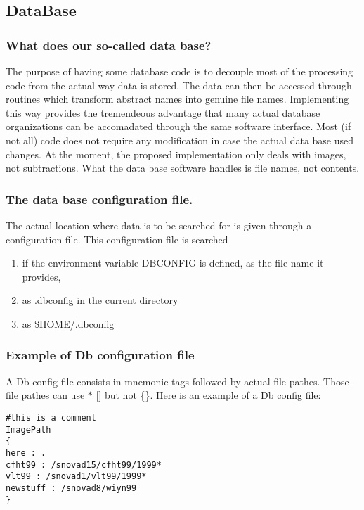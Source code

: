 \subsection{Data\-Base}\label{database_page}
 \subsubsection{What does our so-called data base?}\label{intro_database}
 The purpose of having some database code is to decouple most of the processing code from the actual way data is stored. The data can then be accessed through routines which transform abstract names into genuine file names. Implementing this way provides the tremendeous advantage that many actual database organizations can be accomadated through the same software interface. Most (if not all) code does not require any modification in case the actual data base used changes. At the moment, the proposed implementation only deals with images, not subtractions. What the data base software handles is file names, not contents.

\subsubsection{The data base configuration file.}\label{dbconfig}


The actual location where data is to be searched for is given through a configuration file. This configuration file is searched\begin{enumerate}
\item 
if the environment variable DBCONFIG is defined, as the file name it provides,\item 
as .dbconfig in the current directory\item 
as \$HOME/.dbconfig\end{enumerate}
\subsubsection{Example of Db configuration file}\label{dbconfig_example}
 A Db config file consists in mnemonic tags followed by actual file pathes. Those file pathes can use $\ast$ [] but not \{\}. Here is an example of a Db config file: \footnotesize\begin{verbatim}#this is a comment
ImagePath
{
here : .
cfht99 : /snovad15/cfht99/1999*
vlt99 : /snovad1/vlt99/1999*
newstuff : /snovad8/wiyn99
}\end{verbatim}\normalsize 


